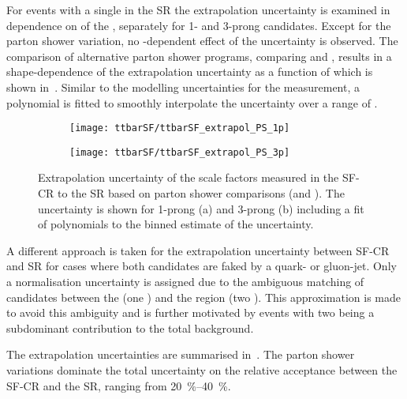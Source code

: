 For \ttbar events with a single \faketauhadvis in the \hadhad SR the
extrapolation uncertainty is examined in dependence on \pT of the
\faketauhadvis, separately for 1- and 3-prong candidates. Except for
the parton shower variation, no \tauhadvis \pT-dependent effect of the
uncertainty is observed.  The comparison of alternative parton shower
programs, comparing \PYTHIA[8] and \HERWIG[7], results in a
shape-dependence of the extrapolation uncertainty as a function of
\tauhadvis \pT which is shown in~.
Similar to the modelling uncertainties for the measurement, a
polynomial is fitted to smoothly interpolate the uncertainty over a
range of \tauhadvis \pT. %

\begin{figure}[htbp]
  \centering

  \begin{subfigure}[t]{.495\textwidth}
    \texttt{[image: ttbarSF/ttbarSF\_extrapol\_PS\_1p]}
    \caption{}
    \label{fig:ttbarSF_extrapol_shape_a}
  \end{subfigure}\hfill%
  \begin{subfigure}[t]{.495\textwidth}
    \texttt{[image: ttbarSF/ttbarSF\_extrapol\_PS\_3p]}
    \caption{}
    \label{fig:ttbarSF_extrapol_shape_b}
  \end{subfigure}

  \caption{Extrapolation uncertainty of the scale factors measured in
    the SF-CR to the \hadhad SR based on parton shower comparisons
    (\PYTHIA[8] and \HERWIG[7]). The uncertainty is shown for 1-prong
    (a) and 3-prong \faketauhadvis (b) including a fit of polynomials
    to the binned estimate of the uncertainty.}
  \label{fig:ttbarSF_extrapol_shape}
\end{figure}

A different approach is taken for the extrapolation uncertainty
between SF-CR and \hadhad SR for cases where both \tauhadvis
candidates are faked by a quark- or gluon-jet. Only a normalisation
uncertainty is assigned due to the ambiguous matching of \tauhadvis
candidates between the \lephad (one \faketauhadvis) and the \hadhad
region (two \faketauhadvis). This approximation is made to avoid this
ambiguity and is further motivated by events with two \faketauhadvis
being a subdominant contribution to the total \ttbarFakes background.

The extrapolation uncertainties are summarised
in~. The parton shower
variations dominate the total uncertainty on the relative acceptance
between the SF-CR and the SR, ranging from \SIrange{20}{40}{\percent}.

